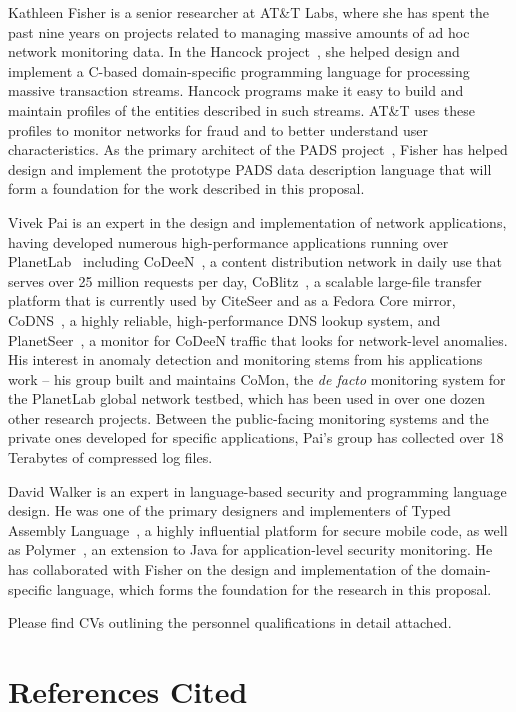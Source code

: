 \documentclass[12pt]{article}
\begin{document}
Kathleen Fisher is a senior researcher at AT\&T Labs,
where she has spent the past nine years on projects
related to managing massive amounts of ad hoc network monitoring data.
In the Hancock project~\cite{kdd00,hancock-toplas}, she helped 
design and implement a C-based
domain-specific programming language for processing massive  
transaction streams.  Hancock programs make it easy to build
and maintain profiles of the entities described in such streams. 
AT\&T uses these profiles to monitor networks for fraud 
and to better understand user characteristics.
As the primary architect of the PADS project~\cite{fisher+:pads}, 
Fisher has helped design and implement the prototype PADS
data description language that will form a foundation for the work
described in this proposal.  

Vivek Pai is an expert in the design and implementation of network
applications, having developed numerous high-performance applications
running over PlanetLab~\cite{planetlab} including
CoDeeN~\cite{codeen}, a content distribution network in daily use that
serves over 25 million requests per day, CoBlitz~\cite{coblitz}, a
scalable large-file transfer platform that is currently used by
CiteSeer and as a Fedora Core mirror, CoDNS~\cite{codns}, a highly
reliable, high-performance DNS lookup system, and
PlanetSeer~\cite{planetseer}, a monitor for CoDeeN traffic that looks
for network-level anomalies.  His interest in anomaly detection and
monitoring stems from his applications work -- his group built and
maintains CoMon, the {\it de facto} monitoring system for the
PlanetLab global network testbed, which has been used in over one
dozen other research projects. Between the public-facing monitoring
systems and the private ones developed for specific applications, Pai's
group has collected over 18 Terabytes of compressed log files.

David Walker is an expert in language-based security and programming
language design.  He was one of the primary designers and implementers
of Typed Assembly Language~\cite{morrisett+:tal,morrisett+:journal-stal}, 
a highly influential platform
for secure mobile code, as well as Polymer~\cite{bauer+:polymer,ligatti+:renewal,ligatti+:edit-automata}, an
extension to Java for application-level security monitoring.  He has
collaborated with Fisher on the design and implementation of the
\pads{} domain-specific language, which forms the foundation for
the research in this proposal.

Please find CVs outlining the personnel qualifications in detail attached.


\newpage
\section{References Cited}

{

}
\end{document}
